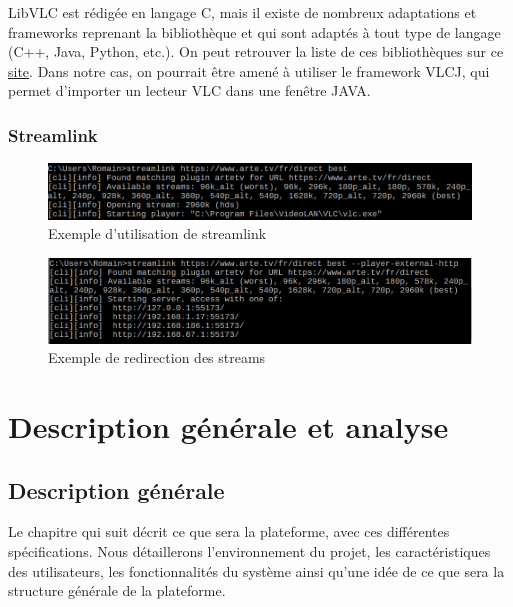 \documentclass{polytech/polytech}
\begin{document}
LibVLC est rédigée en langage C, mais il existe de nombreux adaptations et frameworks reprenant la bibliothèque et qui sont adaptés à tout type de langage (C++, Java, Python, etc.). On peut retrouver la liste de ces bibliothèques sur ce \href{https://wiki.videolan.org/LibVLC/}{site}. Dans notre cas, on pourrait être amené à utiliser le framework VLCJ, qui permet d’importer un lecteur VLC dans une fenêtre JAVA.


\section{Streamlink}
\label{sec:streamlink}

\begin{figure}
	\includegraphics[scale=0.5]{images/streamlink.png}
	\caption{Exemple d'utilisation de streamlink}
	\label{fig:streamlink}
\end{figure}


\begin{figure}
	\includegraphics[scale=0.5]{images/streamlinkHttp.png}
	\caption{Exemple de redirection des streams}
	\label{fig:redir_streamlink}
\end{figure}

\part{Description générale et analyse}


\chapter{Description générale}
\label{chap:description}

Le chapitre qui suit décrit ce que sera la plateforme, avec ces différentes spécifications. Nous détaillerons l’environnement du projet, les caractéristiques des utilisateurs, les fonctionnalités du système ainsi qu’une idée de ce que sera la structure générale de la plateforme.
\end{document}

